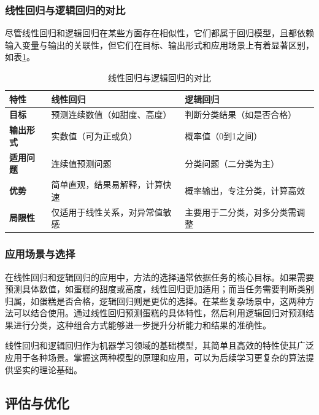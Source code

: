 \subsubsection{线性回归与逻辑回归的对比}

尽管线性回归和逻辑回归在某些方面存在相似性，它们都属于回归模型，且都依赖输入变量与输出的关联性，但它们在目标、输出形式和应用场景上有着显著区别，如表\ref{table999}。

\begin{table}[H]
    \centering
    \caption{线性回归与逻辑回归的对比}
    \label{table999}
    \begin{tabular}{|p{2cm}|p{5cm}|p{5cm}|}
        \hline
        \textbf{特性} & \textbf{线性回归} & \textbf{逻辑回归} \\
        \hline
        \textbf{目标} & 预测连续数值（如甜度、高度） & 判断分类结果（如是否合格） \\
        \hline
        \textbf{输出形式} & 实数值（可为正或负） & 概率值（0到1之间） \\
        \hline
        \textbf{适用问题} & 连续值预测问题 & 分类问题（二分类为主） \\
        \hline
        \textbf{优势} & 简单直观，结果易解释，计算快速 & 概率输出，专注分类，计算高效 \\
        \hline
        \textbf{局限性} & 仅适用于线性关系，对异常值敏感 & 主要用于二分类，对多分类需调整 \\
        \hline
    \end{tabular}
\end{table}


\subsubsection{应用场景与选择}

在线性回归和逻辑回归的应用中，方法的选择通常依据任务的核心目标。如果需要预测具体数值，如蛋糕的甜度或高度，线性回归更加适用；而当任务需要判断类别归属，如蛋糕是否合格，逻辑回归则是更优的选择。在某些复杂场景中，这两种方法可以结合使用。通过线性回归预测蛋糕的具体特性，然后利用逻辑回归对预测结果进行分类，这种组合方式能够进一步提升分析能力和结果的准确性。

线性回归和逻辑回归作为机器学习领域的基础模型，其简单且高效的特性使其广泛应用于各种场景。掌握这两种模型的原理和应用，可以为后续学习更复杂的算法提供坚实的理论基础。

\subsection{评估与优化}

